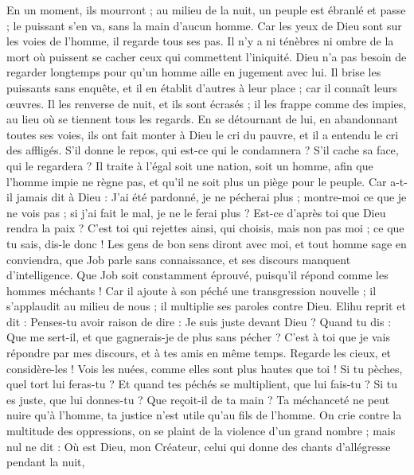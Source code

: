 \begin{multicols}{2}
En un moment, ils mourront ; au milieu de la nuit, un peuple est ébranlé et passe ; le puissant s'en va, sans la main d'aucun homme.
Car les yeux de Dieu sont sur les voies de l'homme, il regarde tous ses pas.
Il n'y a ni ténèbres ni ombre de la mort où puissent se cacher ceux qui commettent l'iniquité.
Dieu n'a pas besoin de regarder longtemps pour qu'un homme aille en jugement avec lui.
Il brise les puissants sans enquête, et il en établit d'autres à leur place ;
car il connaît leurs œuvres. Il les renverse de nuit, et ils sont écrasés ;
il les frappe comme des impies, au lieu où se tiennent tous les regards.
En se détournant de lui, en abandonnant toutes ses voies,
ils ont fait monter à Dieu le cri du pauvre, et il a entendu le cri des affligés.
S'il donne le repos, qui est-ce qui le condamnera ? S'il cache sa face, qui le regardera ? Il traite à l'égal soit une nation, soit un homme,
afin que l'homme impie ne règne pas, et qu'il ne soit plus un piège pour le peuple.
Car a-t-il jamais dit à Dieu : J'ai été pardonné, je ne pécherai plus ;
montre-moi ce que je ne vois pas ; si j'ai fait le mal, je ne le ferai plus ?
Est-ce d'après toi que Dieu rendra la paix ? C'est toi qui rejettes ainsi, qui choisis, mais non pas moi ; ce que tu sais, dis-le donc !
Les gens de bon sens diront avec moi, et tout homme sage en conviendra,
que Job parle sans connaissance, et ses discours manquent d'intelligence.
Que Job soit constamment éprouvé, puisqu'il répond comme les hommes méchants !
Car il ajoute à son péché une transgression nouvelle ; il s'applaudit au milieu de nous ; il multiplie ses paroles contre Dieu.
\VerseOne{}Elihu reprit et dit :
Penses-tu avoir raison de dire : Je suis juste devant Dieu ?
Quand tu dis : Que me sert-il, et que gagnerais-je de plus sans pécher ?
C'est à toi que je vais répondre par mes discours, et à tes amis en même temps.
Regarde les cieux, et considère-les ! Vois les nuées, comme elles sont plus hautes que toi !
Si tu pèches, quel tort lui feras-tu ? Et quand tes péchés se multiplient, que lui fais-tu ?
Si tu es juste, que lui donnes-tu ? Que reçoit-il de ta main ?
Ta méchanceté ne peut nuire qu'à l'homme, ta justice n'est utile qu'au fils de l'homme.
On crie contre la multitude des oppressions, on se plaint de la violence d'un grand nombre ;
mais nul ne dit : Où est Dieu, mon Créateur, celui qui donne des chants d'allégresse pendant la nuit,

\end{multicols}
